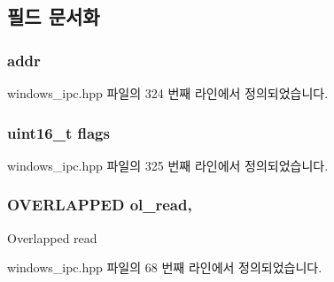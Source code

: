\subsection{필드 문서화}
\subsubsection[{\texorpdfstring{addr}{addr}}]{ addr\hspace{0.3cm}{\ttfamily [private]}}\hypertarget{class_win_n_pipe_ctrl_message_a2fac2b1fbbf46cf80895a34807da1e5f}{}\label{class_win_n_pipe_ctrl_message_a2fac2b1fbbf46cf80895a34807da1e5f}


windows\+\_\+ipc.\+hpp 파일의 324 번째 라인에서 정의되었습니다.

\subsubsection[{\texorpdfstring{flags}{flags}}]{\setlength{\rightskip}{0pt plus 5cm}uint16\+\_\+t flags\hspace{0.3cm}{\ttfamily [private]}}\hypertarget{class_win_n_pipe_ctrl_message_a1e87af3c18a2fd36c61faf89949bdc3f}{}\label{class_win_n_pipe_ctrl_message_a1e87af3c18a2fd36c61faf89949bdc3f}


windows\+\_\+ipc.\+hpp 파일의 325 번째 라인에서 정의되었습니다.

\subsubsection[{\texorpdfstring{ol\+\_\+read}{ol_read}}]{\setlength{\rightskip}{0pt plus 5cm}O\+V\+E\+R\+L\+A\+P\+P\+ED ol\+\_\+read\hspace{0.3cm}{\ttfamily [protected]}, {\ttfamily [inherited]}}\hypertarget{class_windows_n_pipe_message_a710906aa9e22a9cb7a3f1527445f9825}{}\label{class_windows_n_pipe_message_a710906aa9e22a9cb7a3f1527445f9825}
Overlapped read 

windows\+\_\+ipc.\+hpp 파일의 68 번째 라인에서 정의되었습니다.

